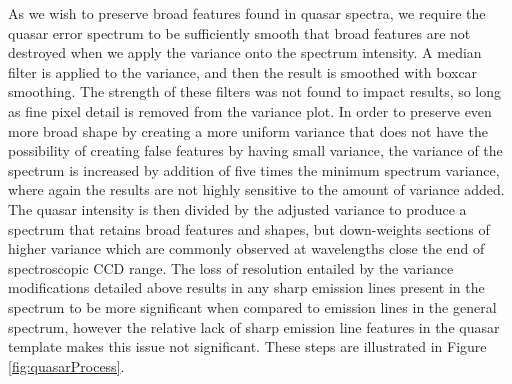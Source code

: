\documentclass[5p]{elsarticle}
\begin{document}
As we wish to preserve broad features found in quasar spectra, we require the quasar error spectrum to be sufficiently smooth that broad features are not destroyed when we apply the variance onto the spectrum intensity. A median filter is applied to the variance, and then the result is smoothed with boxcar smoothing. The strength of these filters was not found to impact results, so long as fine pixel detail is removed from the variance plot. In order to preserve even more broad shape by creating a more uniform variance that does not have the possibility of creating false features by having small variance, the variance of the spectrum is increased by addition of five times the minimum spectrum variance, where again the results are not highly sensitive to the amount of variance added. The quasar intensity is then divided by the adjusted variance to produce a spectrum that retains broad features and shapes, but down-weights sections of higher variance which are commonly observed at wavelengths close the end of spectroscopic CCD range. The loss of resolution entailed by the variance modifications detailed above results in any sharp emission lines present in the spectrum to be more significant when compared to emission lines in the general spectrum, however the relative lack of sharp emission line features in the quasar template makes this issue not significant. These steps are illustrated in Figure \ref{fig:quasarProcess}.\\
\end{document}
